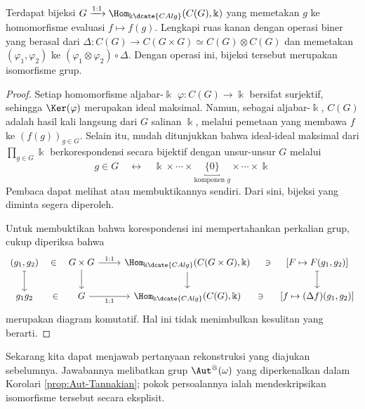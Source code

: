 \begin{lemma}\label{prop:CG-group}
	Terdapat bijeksi
	$G \xrightarrow{1:1} \Hom_{\Bbbk\dcate{CAlg}}(C(G), \Bbbk)$ yang memetakan
	$g$ ke homomorfisme evaluasi $f \mapsto f(g)$. Lengkapi ruas kanan dengan
	operasi biner yang berasal dari
	$\Delta: C(G) \to C(G \times G) \simeq C(G) \otimes C(G)$ dan memetakan
	$(\varphi_1, \varphi_2)$ ke
	$(\varphi_1 \otimes \varphi_2) \circ \Delta$. Dengan operasi ini, bijeksi
	tersebut merupakan isomorfisme grup.
\end{lemma}
\begin{proof}
	Setiap homomorfisme aljabar-$\Bbbk$ $\varphi: C(G) \to \Bbbk$ bersifat surjektif, sehingga $\Ker(\varphi)$ merupakan ideal maksimal. Namun, sebagai aljabar-$\Bbbk$, $C(G)$ adalah hasil kali langsung dari $G$ salinan $\Bbbk$, melalui pemetaan yang membawa $f$ ke $(f(g))_{g \in G}$. Selain itu, mudah ditunjukkan bahwa ideal-ideal maksimal dari $\prod_{g \in G} \Bbbk$ berkorespondensi secara bijektif dengan unsur-unsur $G$ melalui
	\[  g \in G \quad \leftrightarrow \quad \Bbbk \times \cdots \times \underbracket{\{0\}}_{\text{komponen $g$}} \times \cdots \times \Bbbk \]
	Pembaca dapat melihat \cite[Lema 8.9.7]{Li1} atau membuktikannya sendiri. Dari sini, bijeksi yang diminta segera diperoleh.
	
	Untuk membuktikan bahwa korespondensi ini mempertahankan perkalian grup,
	cukup diperiksa bahwa
	\[\begin{tikzcd}
		(g_1, g_2) \arrow[phantom, r, "\in" description] \arrow[mapsto, d] & G \times G \arrow[r, "1:1"] \arrow[d] & \Hom_{\Bbbk\dcate{CAlg}}(C(G \times G), \Bbbk) \arrow[d] & {[F \mapsto F(g_1, g_2)]} \arrow[phantom, l, "\ni" description, sloped] \arrow[mapsto, d] \\
		g_1 g_2 \arrow[phantom, r, "\in" description] & G \arrow[r, "1:1"'] & \Hom_{\Bbbk\dcate{CAlg}}(C(G), \Bbbk) & {[f \mapsto (\Delta f)(g_1, g_2)]} \arrow[phantom, l, "\ni" description, sloped]
	\end{tikzcd}\]
	merupakan diagram komutatif. Hal ini tidak menimbulkan kesulitan yang berarti.
\end{proof}

Sekarang kita dapat menjawab pertanyaan rekonstruksi yang diajukan sebelumnya.
Jawabannya melibatkan grup $\Aut^{\otimes}(\omega)$ yang diperkenalkan dalam
Korolari \ref{prop:Aut-Tannakian}; pokok persoalannya ialah mendeskripsikan isomorfisme
tersebut secara eksplisit.

